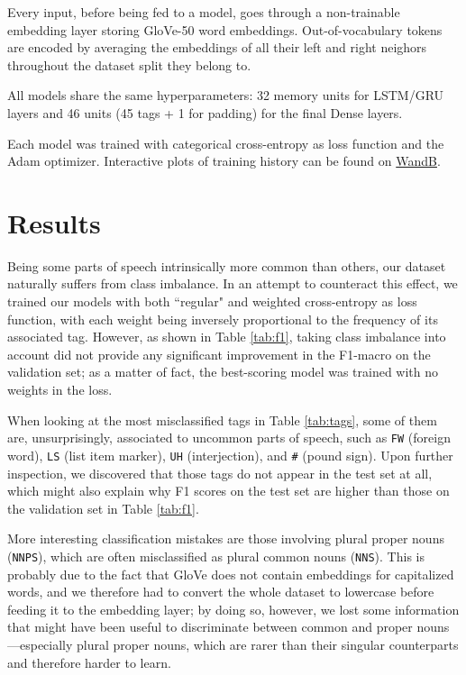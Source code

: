 \documentclass[10pt]{article}
\newcommand{\fw}{\texttt{FW}}
\newcommand{\uh}{\texttt{UH}}
\newcommand{\pound}{\texttt{\#}}
\newcommand{\nnps}{\texttt{NNPS}}
\newcommand{\ls}{\texttt{LS}}
\newcommand{\nns}{\texttt{NNS}}
\begin{document}
Every input, before being fed to a model, goes through a non-trainable embedding layer storing GloVe-50 word embeddings. Out-of-vocabulary tokens are encoded by averaging the embeddings of all their left and right neighors throughout the dataset split they belong to. 

All models share the same hyperparameters: 32 memory units for LSTM/GRU layers and 46 units (45 tags + 1 for padding) for the final Dense layers.

Each model was trained with categorical cross-entropy as loss function and the Adam optimizer. Interactive plots of training history can be found on \href{https://wandb.ai/frantoman/NLP-POS-Tagging/reports/Model-Comparison-Training-Validation---VmlldzoxMjk0Nzc2}{WandB}. 


\section{Results}
Being some parts of speech intrinsically more common than others, our dataset naturally suffers from class imbalance. In an attempt to counteract this effect, we trained our models with both ``regular" and weighted cross-entropy as loss function, with each weight being inversely proportional to the frequency of its associated tag. However, as shown in Table \ref{tab:f1}, taking class imbalance into account did not provide any significant improvement in the F1-macro on the validation set; as a matter of fact, the best-scoring model was trained with no weights in the loss.

When looking at the most misclassified tags in Table \ref{tab:tags}, some of them are, unsurprisingly, associated to uncommon parts of speech, such as \fw{} (foreign word), \ls{} (list item marker), \uh{} (interjection), and \pound{} (pound sign). Upon further inspection, we discovered that those tags do not appear in the test set at all, which might also explain why F1 scores on the test set are higher than those on the validation set in Table \ref{tab:f1}. 

More interesting classification mistakes are those involving plural proper nouns (\nnps), which are often misclassified as plural common nouns (\nns). This is probably due to the fact that GloVe does not contain embeddings for capitalized words, and we therefore had to convert the whole dataset to lowercase before feeding it to the embedding layer; by doing so, however, we lost some information that might have been useful to discriminate between common and proper nouns---especially plural proper nouns, which are rarer than their singular counterparts and therefore harder to learn.
\end{document}

